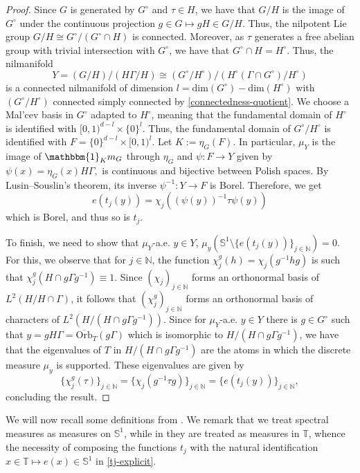 \documentclass[letter, 11pt]{article}
\theoremstyle{definition}
\theoremstyle{plain}
\newcommand{\N}{\mathbb{N}}
\newcommand{\bS}{\mathbb{S}}
\newcommand{\T}{\mathbb{T}}
\newcommand{\ind}[1]{\mathbbm{1}_{#1}}
\newcommand{\1}{\mathbbm{1}}
\begin{document}
\begin{proof}
Since $G$ is generated by $G^\circ$ and $\tau\in H$, we have that $G/H$ is the image of $G^\circ$ under the continuous projection $g\in G\mapsto  gH \in G/H$. Thus, the nilpotent Lie group $G/H\cong G^\circ /(G^\circ \cap H)$ is connected. Moreover, as $\tau$ generates a free abelian group with trivial intersection with $G^\circ$, we have that $G^\circ \cap H= H^\circ$. Thus, the nilmanifold $$Y=(G/H)/(H\Gamma/H)\cong(G^\circ /H^\circ)/(H^\circ (\Gamma\cap G^\circ)/H^\circ)$$ is a connected nilmanifold of dimension $l=\text{dim}(G^\circ) - \text{dim}(H^\circ)$ with $(G^\circ /H^\circ)$ connected simply connected by \cref{connectedness-quotient}. We choose a Mal'cev basis in $G^\circ$ adapted to $H^\circ$, meaning that the fundamental domain of $H^\circ$ is identified with $[0,1)^{d-l}\times \{0\}^l$. Thus, the fundamental domain of $G^\circ/H^\circ$ is identified with $F=\{0\}^{d-l}\times [0,1)^l$. Let $K:=\eta_G(F)$. In particular, $\mu_Y$ is the image of $\ind{K} m_G$ through $\eta_G$ and $\psi : F\to Y$ given by $\psi( x) = \eta_G(x)H\Gamma, $ is continuous and bijective between Polish spaces. By Lusin–Souslin's theorem, its inverse $\psi^{-1}:Y\to F$ is Borel. Therefore, we get
$$e(t_j(y))= \chi_j( (\psi(y))^{-1}\tau \psi(y)) $$
which is Borel, and thus so is $t_j$.

To finish, we need to show that $\mu_Y$-a.e. $y\in Y$, $\mu_y(\bS^1\setminus \{e(t_j(y))\}_{j\in \N})=0$. For this, we observe that for $j\in \N$, the function $\chi_j^g(h) =\chi_j(g^{-1}hg) $ is such that $\chi_j^g(H\cap g\Gamma g^{-1})\equiv 1$. Since $(\chi_j)_{j\in \N}$ forms an orthonormal basis of $L^2(H/H\cap \Gamma)$, it follows that $(\chi_j^g)_{j\in \N}$ forms an orthonormal basis of characters of $L^2(H/(H\cap g\Gamma g^{-1}))$. Since for $\mu_Y$-a.e. $y\in Y$ there is $g\in G^\circ$ such that $y=gH\Gamma=\overline{\mathrm{Orb}}_{T}(g\Gamma)$ which is isomorphic to $H/(H\cap g\Gamma g^{-1})$, we have that the eigenvalues of $T$ in $H/(H\cap g\Gamma g^{-1})$ are the atoms in which the discrete measure $\mu_y$ is supported. These eigenvalues are given by
$$\{\chi_j^g(\tau) \}_{j\in \N} = \{\chi_j(g^{-1}\tau g) \}_{j\in \N}= \{ e(t_j(y)) \}_{j\in \N},$$
concluding the result. 
\end{proof}
We will now recall some definitions from \cite[Section 5]{FRANTZIKINAKIS_HOST_2018}. We remark that we treat spectral measures as measures on $\bS^1$, while in \cite[Section 5]{FRANTZIKINAKIS_HOST_2018} they are treated as measures in $\T$, whence the necessity of composing the functions $t_j$ with the natural identification $x\in \T\mapsto e(x)\in \bS^1$ in \cref{tj-explicit}.
\end{document}
